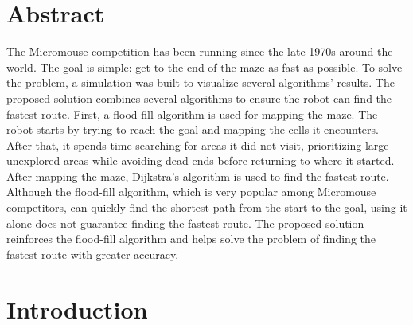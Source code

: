 \documentclass[12pt]{article}
\newcommand\blankpage{
    \null
    \thispagestyle{empty}
    \addtocounter{page}{-1}
    \newpage}
\begin{document}


\blankpage

\tableofcontents

\newpage

\listoffigures
\listoftables
\lstlistoflistings

\newpage

\section{Abstract}
The \gls{Micromouse} competition has been running since the late 1970s around the world.
The goal is simple: get to the end of the \gls{maze} as fast as possible.
To solve the problem, a simulation was built to visualize several algorithms' results.
The proposed solution combines several algorithms to ensure the robot can find the fastest route.
First, a flood-fill algorithm is used for mapping the \gls{maze}. The robot starts by trying to reach the goal and mapping the \gls{cell}s it encounters.
After that, it spends time searching for areas it did not visit, prioritizing large unexplored areas while avoiding dead-ends before returning to where it started.
After mapping the \gls{maze}, Dijkstra's algorithm is used to find the fastest route.
Although the flood-fill algorithm, which is very popular among \gls{Micromouse} competitors, can quickly find the shortest path from the start to the goal, using it alone does not guarantee finding the fastest route.
The proposed solution reinforces the flood-fill algorithm and helps solve the problem of finding the fastest route with greater accuracy.

\newpage

\printglossary

\newpage

\section{Introduction} \label{introduction}
\end{document}
